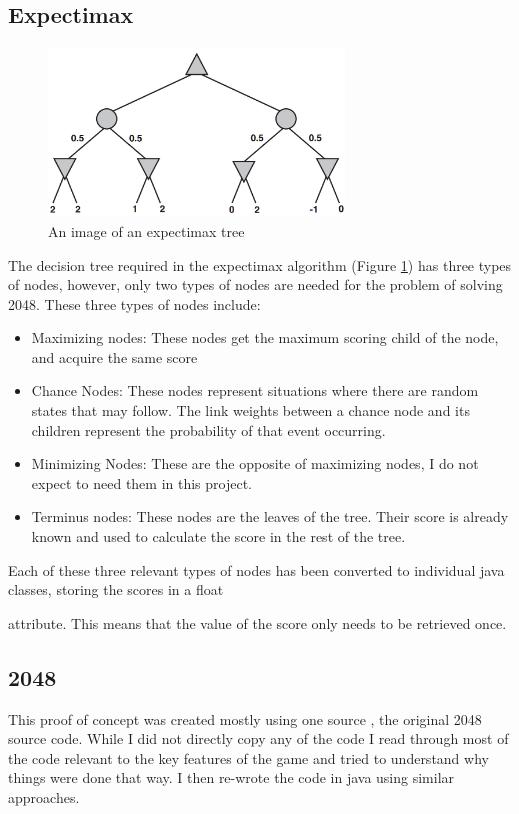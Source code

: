 \documentclass{article}
\begin{document}
\subsection{Expectimax}
\label{subsec:expectimax}
\begin{figure}
    \centering
    \includegraphics[width=0.7\textwidth]{expectimax.png}
    \caption{An image of an expectimax tree \cite[p.~200]{russell2010artificial}}
    \label{fig:expectree}
\end{figure}
The decision tree required in the expectimax algorithm (Figure \ref{fig:expectree}) has three types of nodes, however, only two types of nodes are needed for the problem of solving 2048. These three types of nodes include:
\begin{itemize}
    \item Maximizing nodes: These nodes get the maximum scoring child of the node, and acquire the same score
    \item Chance Nodes: These nodes represent situations where there are random states that may follow. The link weights between
    a chance node and its children represent the probability of that event occurring.
    \item Minimizing Nodes: These are the opposite of maximizing nodes, I do not expect to need them in this project.
    \item Terminus nodes: These nodes are the leaves of the tree. Their score is already known and used to calculate the score in the rest of the tree.
\end{itemize}
Each of these three relevant types of nodes has been converted to individual java classes, storing the scores in a float

attribute. This means that the value of the score only needs to be retrieved once.

\subsection{2048}
\label{subsec:2048}
This proof of concept was created mostly using one source \cite{source2048}, the original 2048 source code. While I did not
directly copy any of the code I read through most of the code relevant to the key features of the game and tried to understand 
why things were done that way. I then re-wrote the code in java using similar approaches.
\end{document}
